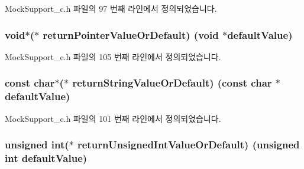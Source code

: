 Mock\+Support\+\_\+c.\+h 파일의 97 번째 라인에서 정의되었습니다.

\subsubsection[{\texorpdfstring{return\+Pointer\+Value\+Or\+Default}{returnPointerValueOrDefault}}]{\setlength{\rightskip}{0pt plus 5cm}void$\ast$($\ast$ return\+Pointer\+Value\+Or\+Default) (void $\ast$default\+Value)}\hypertarget{struct_s_mock_actual_call__c_a5ea57c5c895836ca7b36211167811712}{}\label{struct_s_mock_actual_call__c_a5ea57c5c895836ca7b36211167811712}


Mock\+Support\+\_\+c.\+h 파일의 105 번째 라인에서 정의되었습니다.

\subsubsection[{\texorpdfstring{return\+String\+Value\+Or\+Default}{returnStringValueOrDefault}}]{\setlength{\rightskip}{0pt plus 5cm}const char$\ast$($\ast$ return\+String\+Value\+Or\+Default) (const char $\ast$default\+Value)}\hypertarget{struct_s_mock_actual_call__c_a57df1d8b45c09709b1d15c3213ca86ba}{}\label{struct_s_mock_actual_call__c_a57df1d8b45c09709b1d15c3213ca86ba}


Mock\+Support\+\_\+c.\+h 파일의 101 번째 라인에서 정의되었습니다.

\subsubsection[{\texorpdfstring{return\+Unsigned\+Int\+Value\+Or\+Default}{returnUnsignedIntValueOrDefault}}]{\setlength{\rightskip}{0pt plus 5cm}unsigned int($\ast$ return\+Unsigned\+Int\+Value\+Or\+Default) (unsigned int default\+Value)}\hypertarget{struct_s_mock_actual_call__c_a5bcd1d17f1468d2d48778c42c05a222a}{}\label{struct_s_mock_actual_call__c_a5bcd1d17f1468d2d48778c42c05a222a}


